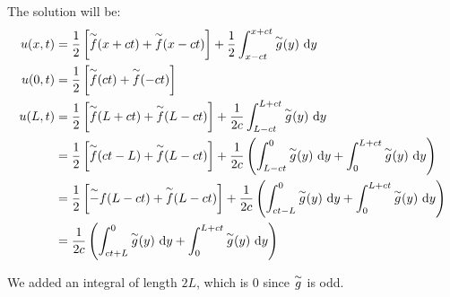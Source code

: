 \documentclass{article}
\begin{document}
The solution will be:
%
\begin{align}
  u(x, t) & = \frac{1}{2}
  \left[ \overset{\sim}{f}(x + ct) + \overset{\sim}{f}(x - ct) \right] +
  \frac{1}{2} \int^{x + ct}_{x - ct} \overset{\sim}{g}(y)\ \text dy\\
  u(0, t) & = \frac{1}{2}
  \left[ \overset{\sim}{f}(ct) + \overset{\sim}{f}(-ct) \right]\\
  u(L, t) & = \frac{1}{2}
  \left[ \overset{\sim}{f}(L + ct) + \overset{\sim}{f}(L - ct) \right] +
  \frac{1}{2c} \int^{L + ct}_{L - ct} \overset{\sim}{g}(y)\ \text dy\\
  & = \frac{1}{2}
  \left[ \overset{\sim}{f}(ct - L) + \overset{\sim}{f}(L - ct) \right] +
  \frac{1}{2c} \left(
  \int^{0}_{L - ct} \overset{\sim}{g}(y)\ \text dy +
  \int^{L + ct}_{0} \overset{\sim}{g}(y)\ \text dy
  \right)\\
  & = \frac{1}{2}
  \left[ \overset{\sim}{-}f(L - ct) + \overset{\sim}{f}(L - ct) \right] +
  \frac{1}{2c} \left(
  \int^{0}_{ct - L} \overset{\sim}{g}(y)\ \text dy +
  \int^{L + ct}_{0} \overset{\sim}{g}(y)\ \text dy
  \right)\\
  & = \frac{1}{2c}
  \left(
  \int^0_{ct + L} \overset{\sim}{g}(y)\ \text dy+
  \int_0^{L + ct} \overset{\sim}{g}(y)\ \text dy
  \right)
\end{align}

We added an integral of length $2L$, which is $0$ since $\overset{\sim}{g}$ is odd.
\end{document}
